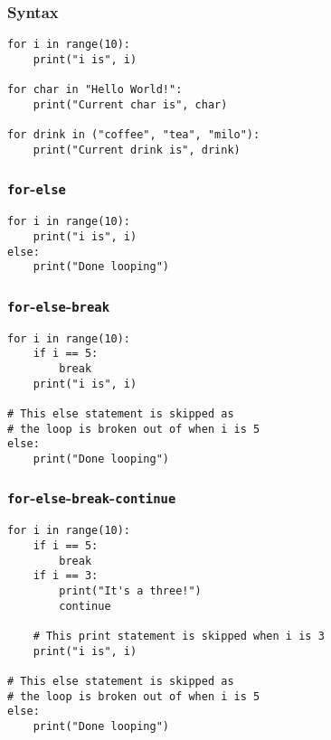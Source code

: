 \documentclass[11pt]{article}
\begin{document}
\subsubsection{Syntax}
\label{sec:org6398dd4}
\begin{verbatim}
for i in range(10):
    print("i is", i)

for char in "Hello World!":
    print("Current char is", char)

for drink in ("coffee", "tea", "milo"):
    print("Current drink is", drink)
\end{verbatim}

\subsubsection{\texttt{for}-\texttt{else}}
\label{sec:org7d40a71}
\begin{verbatim}
for i in range(10):
    print("i is", i)
else:
    print("Done looping")
\end{verbatim}

\subsubsection{\texttt{for}-\texttt{else}-\texttt{break}}
\label{sec:orgb2c448e}
\begin{verbatim}
for i in range(10):
    if i == 5:
        break
    print("i is", i)

# This else statement is skipped as
# the loop is broken out of when i is 5
else:
    print("Done looping")
\end{verbatim}

\subsubsection{\texttt{for}-\texttt{else}-\texttt{break}-\texttt{continue}}
\label{sec:orgd903e5b}
\begin{verbatim}
for i in range(10):
    if i == 5:
        break
    if i == 3:
        print("It's a three!")
        continue

    # This print statement is skipped when i is 3
    print("i is", i)

# This else statement is skipped as
# the loop is broken out of when i is 5
else:
    print("Done looping")
\end{verbatim}
\end{document}
